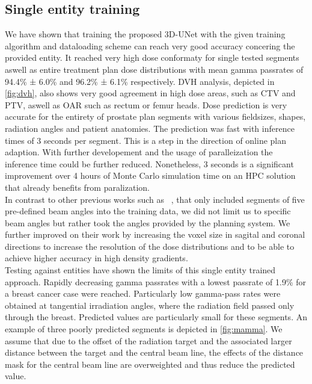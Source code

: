 \subsection{Single entity training}\label{ssec:SET}

We have shown that training the proposed 3D-UNet with the given training algorithm and dataloading scheme can reach very good accuracy concering the provided entity. 
It reached very high dose conformaty for single tested segments aswell as entire treatment plan dose distributions with mean gamma passrates of 94.4\% ± 6.0\% and 96.2\% ± 6.1\% respectively. 
DVH analysis, depicted in \autoref{fig:dvh}, also shows very good agreement in high dose areas, such as CTV and PTV, aswell as \acs{OAR} such as rectum or femur heads. 
Dose prediction is very accurate for the entirety of prostate plan segments with various fieldsizes, shapes, radiation angles and patient anatomies. 
The prediction was fast with inference times of 3 seconds per segment.
This is a step in the direction of online plan adaption. 
With further developement and the usage of paralleization the inference time could be further reduced. 
Nonetheless, 3 seconds is a significant improvement over 4 hours of Monte Carlo simulation time on an \acs{HPC} solution that already benefits from paralization.\\
In contrast to other previous works such as \citeauthor{kontaxis_deepdose_2020}~\cite{kontaxis_deepdose_2020}, that only included segments of five pre-defined beam angles into the training data, we did not limit us to specific beam angles but rather took the angles provided by the planning system.
We further improved on their work by increasing the voxel size in sagital and coronal directions to increase the resolution of the dose distributions and to be able to achieve higher accuracy in high density gradients. \\
Testing against entities have shown the limits of this single entity trained approach. Rapidly decreasing gamma passrates with a lowest passrate of 1.9\% for a breast cancer case were reached. 
Particularly low gamma-pass rates were obtained at tangential irradiation angles, where the radiation field passed only through the breast.
Predicted values are particularly small for these segments. An example of three poorly predicted segments is depicted in \autoref{fig:mamma}.
We assume that due to the offset of the radiation target and the associated larger distance between the target and the central beam line, the effects of the distance mask for the central beam line are overweighted and thus reduce the predicted value.

